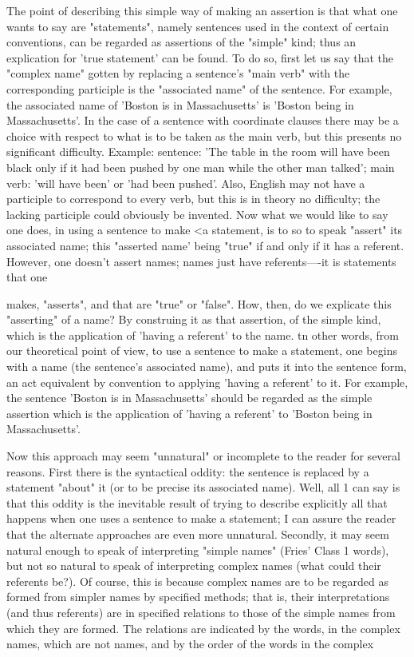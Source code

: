 \documentclass[10pt,twoside]{memoir}
\begin{document}
\begin{enumerate}
{{{{{{{The point of describing this simple way of making an assertion is that 
what one wants to say are "statements", namely sentences used in the 
context of certain conventions, can be regarded as assertions of the "simple" 
kind; thus an explication for 'true statement' can be found. To do so, first 
let us say that the "complex name" gotten by replacing a sentence's "main 
verb" with the corresponding participle is the "associated name" of the 
sentence. For example, the associated name of 'Boston is in Massachusetts' is 
'Boston being in Massachusetts'. In the case of a sentence with coordinate 
clauses there may be a choice with respect to what is to be taken as the main 
verb, but this presents no significant difficulty. Example: sentence: 'The 
table in the room will have been black only if it had been pushed by one 
man while the other man talked'; main verb: 'will have been' or 'had been 
pushed'. Also, English may not have a participle to correspond to every verb, 
but this is in theory no difficulty; the lacking participle could obviously be 
invented. Now what we would like to say one does, in using a sentence to 
make <a statement, is to so to speak "assert" its associated name; this 
"asserted name' being "true" if and only if it has a referent. However, one 
doesn't assert names; names just have referents—-it is statements that one 


makes, "asserts", and that are "true" or "false". How, then, do we explicate 
this "asserting" of a name? By construing it as that assertion, of the simple 
kind, which is the application of 'having a referent' to the name. tn other 
words, from our theoretical point of view, to use a sentence to make a 
statement, one begins with a name (the sentence's associated name), and 
puts it into the sentence form, an act equivalent by convention to applying 
'having a referent' to it. For example, the sentence 'Boston is in 
Massachusetts' should be regarded as the simple assertion which is the 
application of 'having a referent' to 'Boston being in Massachusetts'. 

Now this approach may seem "unnatural" or incomplete to the reader 
for several reasons. First there is the syntactical oddity: the sentence is 
replaced by a statement "about" it (or to be precise its associated name). 
Well, all 1 can say is that this oddity is the inevitable result of trying to 
describe explicitly all that happens when one uses a sentence to make a 
statement; I can assure the reader that the alternate approaches are even 
more unnatural. Secondly, it may seem natural enough to speak of 
interpreting "simple names" (Fries' Class 1 words), but not so natural to 
speak of interpreting complex names (what could their referents be?). Of 
course, this is because complex names are to be regarded as formed from 
simpler names by specified methods; that is, their interpretations (and thus 
referents) are in specified relations to those of the simple names from which 
they are formed. The relations are indicated by the words, in the complex 
names, which are not names, and by the order of the words in the complex 


}}}}}}}
\end{enumerate}
\end{document}
